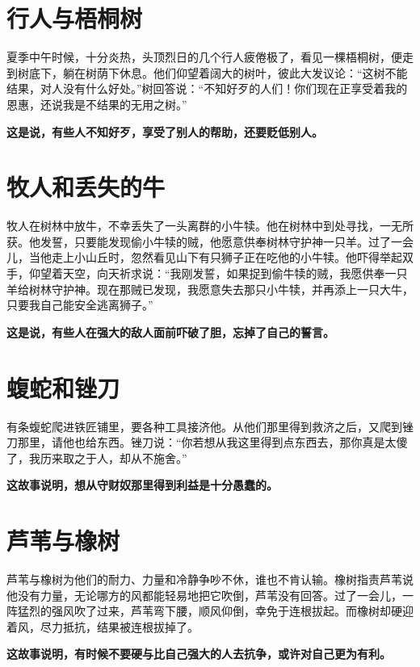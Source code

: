 {\bfseries \color{red}}

\section{行人与梧桐树}

夏季中午时候，十分炎热，头顶烈日的几个行人疲倦极了，看见一棵梧桐树，便走到树底下，躺在树荫下休息。他们仰望着阔大的树叶，彼此大发议论：“这树不能结果，对人没有什么好处。”树回答说：“不知好歹的人们！你们现在正享受着我的恩惠，还说我是不结果的无用之树。”

{\bfseries \color{red}这是说，有些人不知好歹，享受了别人的帮助，还要贬低别人。}

\section{牧人和丢失的牛}

牧人在树林中放牛，不幸丢失了一头离群的小牛犊。他在树林中到处寻找，一无所获。他发誓，只要能发现偷小牛犊的贼，他愿意供奉树林守护神一只羊。过了一会儿，当他走上小山丘时，忽然看见山下有只狮子正在吃他的小牛犊。他吓得举起双手，仰望着天空，向天祈求说：“我刚发誓，如果捉到偷牛犊的贼，我愿供奉一只羊给树林守护神。现在那贼已发现，我愿意失去那只小牛犊，并再添上一只大牛，只要我自己能安全逃离狮子。”

{\bfseries \color{red}这是说，有些人在强大的敌人面前吓破了胆，忘掉了自己的誓言。}

\section{蝮蛇和锉刀}

有条蝮蛇爬进铁匠铺里，要各种工具接济他。从他们那里得到救济之后，又爬到锉刀那里，请他也给东西。锉刀说：“你若想从我这里得到点东西去，那你真是太傻了，我历来取之于人，却从不施舍。”

{\bfseries \color{red}这故事说明，想从守财奴那里得到利益是十分愚蠢的。}

\section{芦苇与橡树}

芦苇与橡树为他们的耐力、力量和冷静争吵不休，谁也不肯认输。橡树指责芦苇说他没有力量，无论哪方的风都能轻易地把它吹倒，芦苇没有回答。过了一会儿，一阵猛烈的强风吹了过来，芦苇弯下腰，顺风仰倒，幸免于连根拔起。而橡树却硬迎着风，尽力抵抗，结果被连根拔掉了。

{\bfseries \color{red}这故事说明，有时候不要硬与比自己强大的人去抗争，或许对自己更为有利。}

